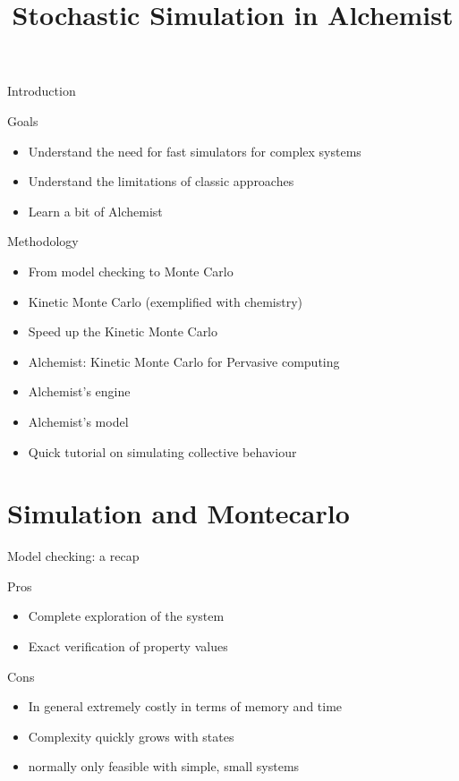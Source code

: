 \documentclass[presentation]{beamer}
\title[Simulation]{Stochastic Simulation in Alchemist}
\begin{document}
\frame[label=coverpage]{\titlepage}

\newcommand{\ov}[1]{\(\overline{\texttt{#1}}\)}
\newcommand{\pedix}[1]{\({}_{\texttt{#1}}\)}
\newcommand{\apedix}[1]{\({}^{\texttt{#1}}\)}
\newcommand{\p}[0]{\('\)}
\newcommand{\xt}[1]{\texttt{#1}}
\newcommand{\bnfs}[0] {\;|\;}
\newcommand{\opar}[0] {\,||\,}
\newcommand{\temp}[1] {#1}

\begin{frame}{Introduction}
 \begin{block}{Goals}
  \begin{itemize}
        \item Understand the need for fast simulators for complex systems
        \item Understand the limitations of classic approaches
        \item Learn a bit of Alchemist
  \end{itemize}
 \end{block} 
 \begin{block}{Methodology}
  \begin{itemize}
        \item From model checking to Monte Carlo
        \item Kinetic Monte Carlo (exemplified with chemistry)
        \item Speed up the Kinetic Monte Carlo
        \item Alchemist: Kinetic Monte Carlo for Pervasive computing
        \item Alchemist's engine
        \item Alchemist's model
        \item Quick tutorial on simulating collective behaviour
  \end{itemize}
 \end{block}
\end{frame}

\section{Simulation and Montecarlo}
\begin{frame}{Model checking: a recap}
 \begin{block}{Pros}
  \begin{itemize}
        \item Complete exploration of the system
        \item Exact verification of property values
  \end{itemize}
 \end{block}
 \begin{block}{Cons}
  \begin{itemize}
        \item In general extremely costly in terms of memory and time
        \item Complexity quickly grows with states
        \item normally only feasible with simple, small systems
  \end{itemize}
 \end{block}
\end{frame}
\end{document}
